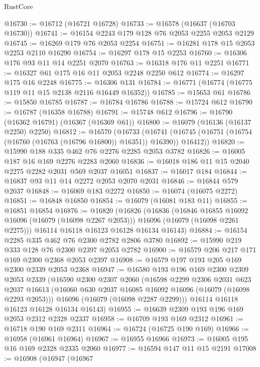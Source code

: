 \begin{lexlean}{RustCore}
\begin{coremodule}
@16730 := @16712 (@16721 @16728)
@16733 := @16578 (@16637 (@16703 @16730))
@16741 := @16154 @2243 @179 @128 @76 @2053 @2255 @2053 @2129
@16745 := @16269 @179 @76 @2053 @2254
@16751 := @16281 @178 @15 @2053 @2253 @2110 @16290
@16754 := @16297 @178 @15 @2253
@16760 := @16306 @176 @93 @11 @14 @2251 @2070
@16763 := @16318 @176 @11 @2251
@16771 := @16327 @61 @175 @16 @11 @2053 @2248 @2250 @612
@16774 := @16297 @175 @16 @2248
@16775 := @16306 @131
@16784 := @16771 (@16774 (@16775 @119 @11 @15 @2138 @2116 @16449 @16352))
@16785 := @15653 @61
@16786 := @15850 @16785
@16787 := @16784 @16786
@16788 := @15724 @612
@16790 := @16787 (@16358 @16788)
@16791 := @15748 @612
@16796 := @16790 (@16362 @16791) (@16367 (@16369 @61))
@16800 := @16079 (@16136 (@16137 @2250) @2250)
@16812 := @16570
    (@16733
      (@16741 (@16745 (@16751 (@16754 (@16760 (@16763 (@16796 @16800)) @16351)) @16390)) @16412))
@16820 := @15990 @188 @335 @462 @76 @2276 @2285 @2053 @3782
@16826 := @16005 @187 @16 @169 @2276 @2283 @2060
@16836 := @16018 @186 @11 @15 @2040 @2275 @2282 @2031 @569 @2037 @16051
@16837 := @16017 @184
@16844 := @16837 @93 @11 @14 @2272 @2053 @2070 @2031
@16846 := @16844 @579 @2037
@16848 := @16069 @183 @2272
@16850 := @16074 (@16075 @2272)
@16851 := @16848 @16850
@16854 := @16079 (@16081 @183 @11)
@16855 := @16851 @16854
@16876 := @16820
    (@16826
      (@16836
        (@16846 @16855 @16092 @16096 (@16079 (@16098 @2267 @2053)))
        @16096
        (@16079 (@16098 @2261 @2275)))
      @16114
      @16118
      @16123
      @16128
      @16134
      @16143)
@16884 := @16154 @2285 @335 @462 @76 @2300 @2782 @2806 @3780
@16892 := @15990 @219 @333 @128 @76 @2300 @2397 @2053 @2782
@16900 := @16579 @206 @217 @171 @169 @2300 @2368 @2053 @2397
@16908 := @16579 @197 @193 @205 @169 @2300 @2339 @2053 @2368
@16947 := @16580
    @193
    @196
    @169
    @2300
    @2309
    @2053
    @2339
    (@16590
      @2300
      @2307
      @2060
      (@16598
        @2299
        @2306
        @2031
        @623
        @2037
        @16613
        (@16060 @630 @2037 @16085 @16092 @16096 (@16079 (@16098 @2293 @2053)))
        @16096
        (@16079 (@16098 @2287 @2299)))
      @16114
      @16118
      @16123
      @16128
      @16134
      @16143)
@16955 := @16639 @2309 @193 @196 @169 @2053 @2312 @2328 @2337
@16958 := @16709 @193 @169 @2312
@16961 := @16718 @190 @169 @2311
@16964 := @16724 (@16725 @190 @169)
@16966 := @16958 (@16961 @16964)
@16967 := @16955 @16966
@16973 := @16005 @195 @16 @169 @2328 @2335 @2060
@16977 := @16594 @147 @11 @15 @2191
@17008 := @16908
    (@16947
      (@16967

\end{coremodule}
\end{lexlean}

